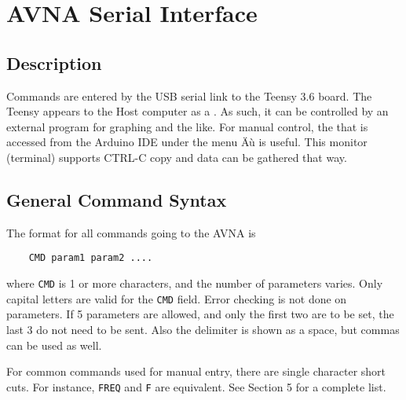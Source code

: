 \section{AVNA Serial Interface}
\label{sect:Ser}   %
\subsection{Description}
\label{subsect:SerDes}
Commands are entered by the USB serial link to the Teensy 3.6 board. The Teensy appears to the Host computer as a . As such, it can be controlled by an external program for graphing and the like.  For manual control, the  that is accessed from the Arduino IDE under the menu Äù is useful.  This monitor (terminal) supports CTRL-C copy and data can be gathered that way.

\subsection{General Command Syntax}
\label{subsect:SerSyn}
The format for all commands going to the AVNA is
\begin{verbatim}
    CMD param1 param2 ....
\end{verbatim}
where \texttt{CMD} is 1 or more characters, and the number of parameters varies.  Only capital letters are valid for the \texttt{CMD} field. Error checking is not done on parameters.  If 5 parameters are allowed, and only the first two are to be set, the last 3 do not need to be sent.  Also the delimiter is shown as a space, but commas can be used as well.

For common commands used for manual entry, there are single character short cuts.  For instance, \texttt{FREQ} and \texttt{F} are equivalent. See Section 5 for a complete list.

